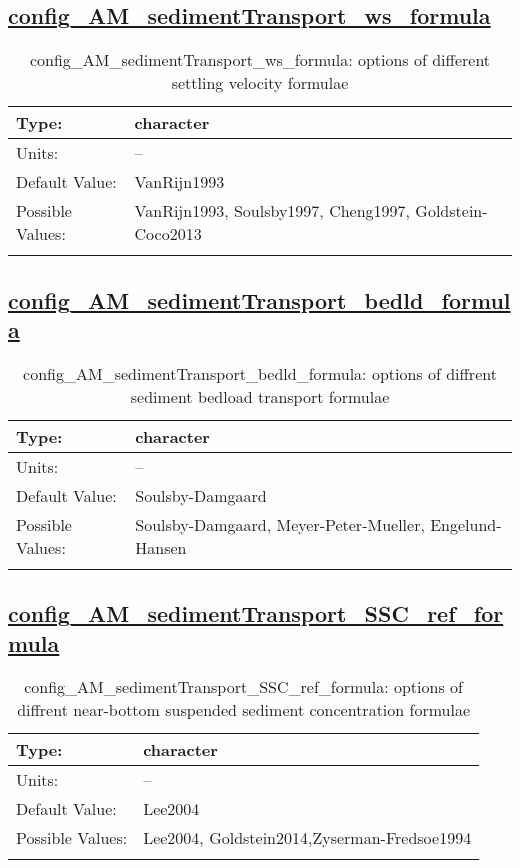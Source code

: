 \subsection[config\_AM\_sedimentTransport\_ws\_formula]{\hyperref[sec:nm_tab_AM_sedimentTransport]{config\_AM\_sedimentTransport\_ws\_formula}}
\label{subsec:nm_sec_config_AM_sedimentTransport_ws_formula}
\begin{center}
\begin{longtable}{| p{2.0in} || p{4.0in} |}
    \hline
    Type: & character \\
    \hline
    Units: & -- \\
    \hline
    Default Value: & VanRijn1993 \\
    \hline
    Possible Values: & VanRijn1993, Soulsby1997, Cheng1997, Goldstein-Coco2013 \\
    \hline
    \caption{config\_AM\_sedimentTransport\_ws\_formula: options of different settling velocity formulae}
\end{longtable}
\end{center}
\subsection[config\_AM\_sedimentTransport\_bedld\_formula]{\hyperref[sec:nm_tab_AM_sedimentTransport]{config\_AM\_sedimentTransport\_bedld\_formula}}
\label{subsec:nm_sec_config_AM_sedimentTransport_bedld_formula}
\begin{center}
\begin{longtable}{| p{2.0in} || p{4.0in} |}
    \hline
    Type: & character \\
    \hline
    Units: & -- \\
    \hline
    Default Value: & Soulsby-Damgaard \\
    \hline
    Possible Values: & Soulsby-Damgaard, Meyer-Peter-Mueller, Engelund-Hansen \\
    \hline
    \caption{config\_AM\_sedimentTransport\_bedld\_formula: options of diffrent sediment bedload transport formulae}
\end{longtable}
\end{center}
\subsection[config\_AM\_sedimentTransport\_SSC\_ref\_formula]{\hyperref[sec:nm_tab_AM_sedimentTransport]{config\_AM\_sedimentTransport\_SSC\_ref\_formula}}
\label{subsec:nm_sec_config_AM_sedimentTransport_SSC_ref_formula}
\begin{center}
\begin{longtable}{| p{2.0in} || p{4.0in} |}
    \hline
    Type: & character \\
    \hline
    Units: & -- \\
    \hline
    Default Value: & Lee2004 \\
    \hline
    Possible Values: & Lee2004, Goldstein2014,Zyserman-Fredsoe1994 \\
    \hline
    \caption{config\_AM\_sedimentTransport\_SSC\_ref\_formula: options of diffrent near-bottom suspended sediment concentration formulae}
\end{longtable}
\end{center}
